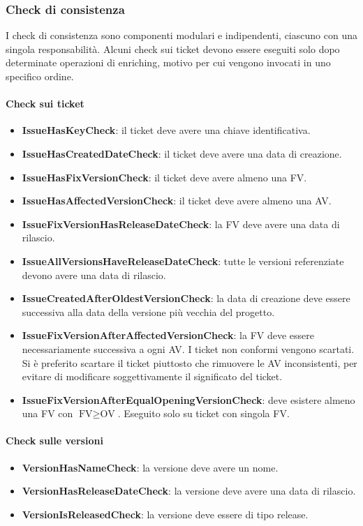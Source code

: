 \subsubsection{Check di consistenza}

I check di consistenza sono componenti modulari e indipendenti, ciascuno con una singola
responsabilità. Alcuni check sui ticket devono essere eseguiti solo dopo determinate
operazioni di enriching, motivo per cui vengono invocati in uno specifico ordine.

\paragraph{Check sui ticket}
\begin{itemize}
    \item \textbf{IssueHasKeyCheck}: il ticket deve avere una chiave identificativa.
    \item \textbf{IssueHasCreatedDateCheck}: il ticket deve avere una data di creazione.
    \item \textbf{IssueHasFixVersionCheck}: il ticket deve avere almeno una FV.
    \item \textbf{IssueHasAffectedVersionCheck}: il ticket deve avere almeno una AV.
    \item \textbf{IssueFixVersionHasReleaseDateCheck}: la FV deve avere una data di rilascio.
    \item \textbf{IssueAllVersionsHaveReleaseDateCheck}: tutte le versioni referenziate
    devono avere una data di rilascio.
    \item \textbf{IssueCreatedAfterOldestVersionCheck}: la data di creazione deve essere
    successiva alla data della versione più vecchia del progetto.
    \item \textbf{IssueFixVersionAfterAffectedVersionCheck}: la FV deve essere
    necessariamente successiva a ogni AV. I ticket non conformi vengono scartati. Si è
    preferito scartare il ticket piuttosto che rimuovere le AV inconsistenti, per evitare
    di modificare soggettivamente il significato del ticket.
    \item \textbf{IssueFixVersionAfterEqualOpeningVersionCheck}: deve esistere almeno una
    FV con $\text{FV} \geq \text{OV}$. Eseguito solo su ticket con singola FV.
\end{itemize}

\paragraph{Check sulle versioni}
\begin{itemize}
    \item \textbf{VersionHasNameCheck}: la versione deve avere un nome.
    \item \textbf{VersionHasReleaseDateCheck}: la versione deve avere una data di rilascio.
    \item \textbf{VersionIsReleasedCheck}: la versione deve essere di tipo release.
\end{itemize}

